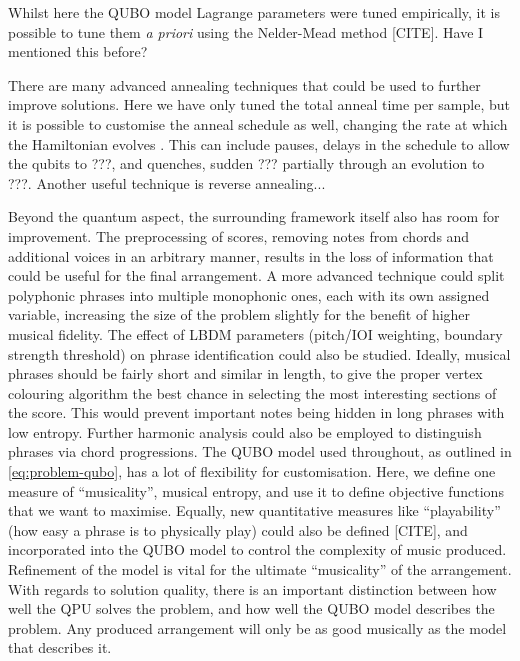 \documentclass[12pt]{article}
\theoremstyle{definition}
\begin{document}
Whilst here the QUBO model Lagrange parameters were tuned empirically, it is possible to tune them \textit{a priori} using the Nelder-Mead method [CITE]. Have I mentioned this before?

There are many advanced annealing techniques that could be used to further improve solutions. Here we have only tuned the total anneal time per sample, but it is possible to customise the anneal schedule as well, changing the rate at which the Hamiltonian evolves \cite{khezri_customized_2022}. This can include pauses, delays in the schedule to allow the qubits to ???, and quenches, sudden ??? partially through an evolution to ???. Another useful technique is reverse annealing...

Beyond the quantum aspect, the surrounding framework itself also has room for improvement. The preprocessing of scores, removing notes from chords and additional voices in an arbitrary manner, results in the loss of information that could be useful for the final arrangement. A more advanced technique could split polyphonic phrases into multiple monophonic ones, each with its own assigned variable, increasing the size of the problem slightly for the benefit of higher musical fidelity.
The effect of LBDM parameters (pitch/IOI weighting, boundary strength threshold) on phrase identification could also be studied. Ideally, musical phrases should be fairly short and similar in length, to give the proper vertex colouring algorithm the best chance in selecting the most interesting sections of the score. This would prevent important notes being hidden in long phrases with low entropy. Further harmonic analysis could also be employed to distinguish phrases via chord progressions.
The QUBO model used throughout, as outlined in \cref{eq:problem-qubo}, has a lot of flexibility for customisation. Here, we define one measure of ``musicality'', musical entropy, and use it to define objective functions that we want to maximise. Equally, new quantitative measures like ``playability'' (how easy a phrase is to physically play) could also be defined [CITE], and incorporated into the QUBO model to control the complexity of music produced. Refinement of the model is vital for the ultimate ``musicality'' of the arrangement. With regards to solution quality, there is an important distinction between how well the QPU solves the problem, and how well the QUBO model describes the problem. Any produced arrangement will only be as good musically as the model that describes it.
\end{document}
